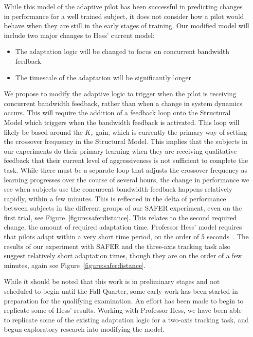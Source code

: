 While this model of the adaptive pilot has been successful in predicting changes in performance for a well trained subject, it does not consider how a pilot would behave when they are still in the early stages of training.
Our modified model will include two major changes to Hess' current model:
\begin{itemize}
    \item The adaptation logic will be changed to focus on concurrent bandwidth feedback
    \item The timescale of the adaptation will be significantly longer
\end{itemize}

We propose to modify the adaptive logic to trigger when the pilot is receiving concurrent bandwidth feedback, rather than when a change in system dynamics occurs.
This will require the addition of a feedback loop onto the Structural Model which triggers when the bandwidth feedback is activated.
This loop will likely be based around the $K_e$ gain, which is currently the primary way of setting the crossover frequency in the Structural Model.
This implies that the subjects in our experiments do their primary learning when they are receiving qualitative feedback that their current level of aggressiveness is not sufficient to complete the task.
While there must be a separate loop that adjusts the crossover frequency as learning progresses over the course of several hours, the change in performance we see when subjects use the concurrent bandwidth feedback happens relatively rapidly, within a few minutes.
This is reflected in the delta of performance between subjects in the different groups of our SAFER experiment, even on the first trial, see Figure~\ref{figure:saferdistance}.
This relates to the second required change, the amount of required adaptation time.
Professor Hess' model requires that pilots adapt within a very short time period, on the order of 5 seconds~\citep{weir_model_1966}.
The results of our experiment with SAFER and the three-axis tracking task also suggest relatively short adaptation times, though they are on the order of a few minutes, again see Figure~\ref{figure:saferdistance}.

While it should be noted that this work is in preliminary stages and not scheduled to begin until the Fall Quarter, some early work has been started in preparation for the qualifying examination.
An effort has been made to begin to replicate some of Hess' results.
Working with Professor Hess, we have been able to replicate some of the existing adaptation logic for a two-axis tracking task, and begun exploratory research into modifying the model.
